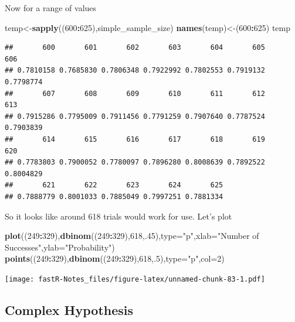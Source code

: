 \documentclass[]{book}
\newenvironment{Shaded}{\begin{snugshade}}{\end{snugshade}}
\newcommand{\KeywordTok}[1]{\textcolor[rgb]{0.13,0.29,0.53}{\textbf{#1}}}
\newcommand{\DataTypeTok}[1]{\textcolor[rgb]{0.13,0.29,0.53}{#1}}
\newcommand{\DecValTok}[1]{\textcolor[rgb]{0.00,0.00,0.81}{#1}}
\newcommand{\StringTok}[1]{\textcolor[rgb]{0.31,0.60,0.02}{#1}}
\newcommand{\OperatorTok}[1]{\textcolor[rgb]{0.81,0.36,0.00}{\textbf{#1}}}
\newcommand{\NormalTok}[1]{#1}
\theoremstyle{definition}
\theoremstyle{definition}
\theoremstyle{definition}
\theoremstyle{remark}
\begin{document}
Now for a range of values

\begin{Shaded}
\begin{Highlighting}[]
\NormalTok{temp<-}\KeywordTok{sapply}\NormalTok{((}\DecValTok{600}\OperatorTok{:}\DecValTok{625}\NormalTok{),simple_sample_size)}
\KeywordTok{names}\NormalTok{(temp)<-(}\DecValTok{600}\OperatorTok{:}\DecValTok{625}\NormalTok{)}
\NormalTok{temp    }
\end{Highlighting}
\end{Shaded}

\begin{verbatim}
##       600       601       602       603       604       605       606 
## 0.7810158 0.7685830 0.7806348 0.7922992 0.7802553 0.7919132 0.7798774 
##       607       608       609       610       611       612       613 
## 0.7915286 0.7795009 0.7911456 0.7791259 0.7907640 0.7787524 0.7903839 
##       614       615       616       617       618       619       620 
## 0.7783803 0.7900052 0.7780097 0.7896280 0.8008639 0.7892522 0.8004829 
##       621       622       623       624       625 
## 0.7888779 0.8001033 0.7885049 0.7997251 0.7881334
\end{verbatim}

So it looks like around 618 trials would work for use. Let's plot

\begin{Shaded}
\begin{Highlighting}[]
\KeywordTok{plot}\NormalTok{((}\DecValTok{249}\OperatorTok{:}\DecValTok{329}\NormalTok{),}\KeywordTok{dbinom}\NormalTok{((}\DecValTok{249}\OperatorTok{:}\DecValTok{329}\NormalTok{),}\DecValTok{618}\NormalTok{,.}\DecValTok{45}\NormalTok{),}\DataTypeTok{type=}\StringTok{"p"}\NormalTok{,}\DataTypeTok{xlab=}\StringTok{"Number of Successes"}\NormalTok{,}\DataTypeTok{ylab=}\StringTok{"Probability"}\NormalTok{)}
\KeywordTok{points}\NormalTok{((}\DecValTok{249}\OperatorTok{:}\DecValTok{329}\NormalTok{),}\KeywordTok{dbinom}\NormalTok{((}\DecValTok{249}\OperatorTok{:}\DecValTok{329}\NormalTok{),}\DecValTok{618}\NormalTok{,.}\DecValTok{5}\NormalTok{),}\DataTypeTok{type=}\StringTok{"p"}\NormalTok{,}\DataTypeTok{col=}\DecValTok{2}\NormalTok{)}
\end{Highlighting}
\end{Shaded}

\texttt{[image: fastR-Notes\_files/figure-latex/unnamed-chunk-83-1.pdf]}

\subsection{Complex Hypothesis}\label{complex-hypothesis}
\end{document}

